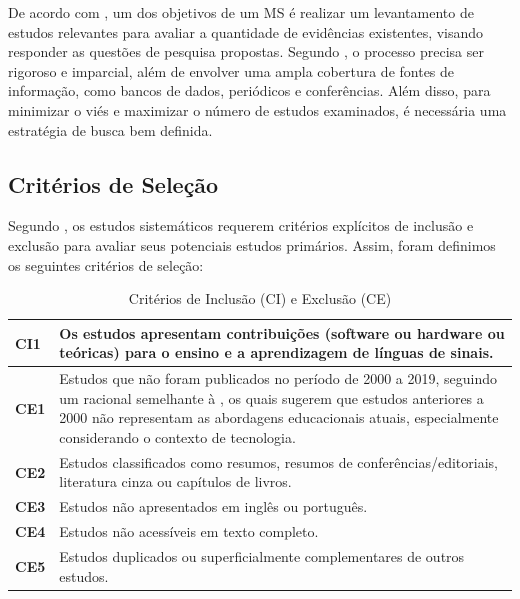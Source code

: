 De acordo com  , um dos objetivos de um MS é realizar um levantamento de estudos relevantes para avaliar a quantidade de evidências existentes, visando responder as questões de pesquisa propostas. Segundo , o processo precisa ser rigoroso e imparcial, além de envolver uma ampla cobertura de fontes de informação, como bancos de dados, periódicos e conferências. Além disso, para minimizar o viés e maximizar o número de estudos examinados, é necessária uma estratégia de busca bem definida. %

\subsection{Critérios de Seleção}
\label{ms:conducao-busca}

Segundo , os estudos sistemáticos requerem critérios explícitos de inclusão e exclusão para avaliar seus potenciais estudos primários. Assim, foram definimos os seguintes critérios de seleção:

\begin{table}[htbp]
\caption{Critérios de Inclusão (CI) e Exclusão (CE)}
\label{tab:ms:criterios-selecao}
\begin{tabularx}{\textwidth}{C{1cm}|X} \hline
\textbf{CI1} & Os estudos apresentam contribuições (software ou hardware ou teóricas) para o ensino e a aprendizagem de línguas de sinais. \\ \hline
\textbf{CE1} & Estudos que não foram publicados no período de 2000 a 2019, seguindo um racional semelhante à , os quais sugerem que estudos anteriores a 2000 não representam as abordagens educacionais atuais, especialmente considerando o contexto de tecnologia. \\ \hline
\textbf{CE2} & Estudos classificados como resumos, resumos de conferências/editoriais, literatura cinza ou capítulos de livros. \\ \hline
\textbf{CE3} & Estudos não apresentados em inglês ou português. \\ \hline
\textbf{CE4} & Estudos não acessíveis em texto completo. \\ \hline
\textbf{CE5} & Estudos duplicados ou superficialmente complementares de outros estudos. \\ \hline
\end{tabularx}
\fautor
\end{table}

